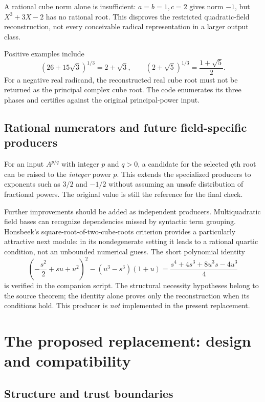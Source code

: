 \documentclass[11pt,letterpaper]{article}
\theoremstyle{definition}
\begin{document}
A rational cube norm alone is insufficient: $a=b=1,c=2$ gives norm $-1$, but $X^3+3X-2$ has no rational root. This disproves the restricted quadratic-field reconstruction, not every conceivable radical representation in a larger output class.

Positive examples include
\[
 (26+15\sqrt3)^{1/3}=2+\sqrt3,
 \qquad (2+\sqrt5)^{1/3}=\frac{1+\sqrt5}{2}.
\]
For a negative real radicand, the reconstructed real cube root must not be returned as the principal complex cube root. The code enumerates its three phases and certifies against the original principal-power input.

\subsection{Rational numerators and future field-specific producers}

For an input $A^{p/q}$ with integer $p$ and $q>0$, a candidate for the selected $q$th root can be raised to the \emph{integer} power $p$. This extends the specialized producers to exponents such as $3/2$ and $-1/2$ without assuming an unsafe distribution of fractional powers. The original value is still the reference for the final check.

Further improvements should be added as independent producers. Multiquadratic field bases can recognize dependencies missed by syntactic term grouping. Honsbeek's square-root-of-two-cube-roots criterion provides a particularly attractive next module: in its nondegenerate setting it leads to a rational quartic condition, not an unbounded numerical guess. The short polynomial identity
\[
 \left(-\frac{s^2}{2}+su+u^2\right)^2
 -(u^3-s^3)(1+u)
 =\frac{s^4+4s^3+8u^3s-4u^3}{4}
\]
is verified in the companion script. The structural necessity hypotheses belong to the source theorem; the identity alone proves only the reconstruction when its conditions hold. This producer is \emph{not} implemented in the present replacement.\cite{honsbeek}

\section{The proposed replacement: design and compatibility}\label{sec:replacement}

\subsection{Structure and trust boundaries}
\end{document}
